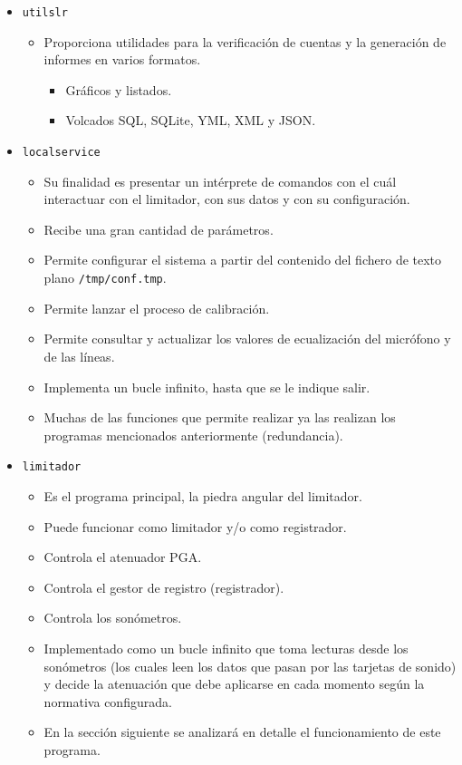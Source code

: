 \begin{itemize}
    \item \verb|utilslr|
    \begin{itemize}
        \item Proporciona utilidades para la verificación de cuentas y la generación de informes en varios formatos.
        \begin{itemize}
            \item Gráficos y listados.
            \item Volcados SQL, SQLite, YML, XML y JSON.
        \end{itemize}
    \end{itemize}

    \item \verb|localservice|
    \begin{itemize}
        \item Su finalidad es presentar un intérprete de comandos con el cuál interactuar con el limitador, con sus datos y con su configuración.
        \item Recibe una gran cantidad de parámetros.
        \item Permite configurar el sistema a partir del contenido del fichero de texto plano \verb|/tmp/conf.tmp|.
        \item Permite lanzar el proceso de calibración.
        \item Permite consultar y actualizar los valores de ecualización del micrófono y de las líneas.
        \item Implementa un bucle infinito, hasta que se le indique salir.
        \item Muchas de las funciones que permite realizar ya las realizan los programas mencionados anteriormente (redundancia).
    \end{itemize}

    \item \verb|limitador|
    \begin{itemize}
        \item Es el programa principal, la piedra angular del limitador.
        \item Puede funcionar como limitador y/o como registrador.
        \item Controla el atenuador PGA.
        \item Controla el gestor de registro (registrador).
        \item Controla los sonómetros.
        \item Implementado como un bucle infinito que toma lecturas desde los sonómetros (los cuales leen los datos que pasan por las tarjetas de sonido) y decide la atenuación que debe aplicarse en cada momento según la normativa configurada.
        \item En la sección siguiente se analizará en detalle el funcionamiento de este programa.
    \end{itemize}


\end{itemize}
